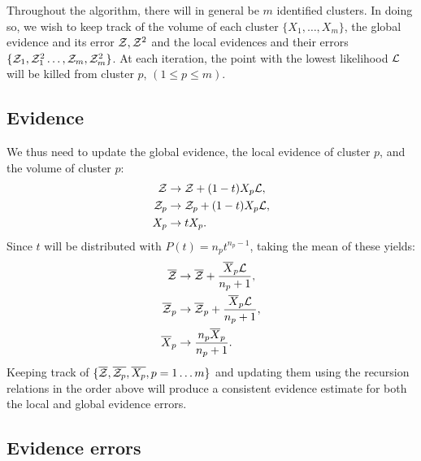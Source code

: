 Throughout the algorithm, there will in general be \(m\) identified clusters. In doing so, we wish to keep track of the volume of each cluster \(\{X_1,\ldots,X_m\}\), the global evidence and its error \(\mathcal{Z},\mathcal{Z}^2\) and the local evidences and their errors \(\{\mathcal{Z}_1,\mathcal{Z}_1^2\ldots,\mathcal{Z}_m,\mathcal{Z}_m^2\}\). At each iteration, the point with the lowest likelihood \(\mathcal{L}\) will be killed from cluster \(p\), \({(1\le p\le m)}\). 


\subsection{Evidence}
\label{sec:ens:cluster_ev}

We thus need to update the global evidence, the local evidence of cluster \(p\), and the volume of cluster \(p\):
%
\begin{align}
  \mathcal{Z} &\to \mathcal{Z} + (1-t)X_p\mathcal{L},
  \label{eqn:ens:rr_ev}\\
  \mathcal{Z}_p &\to \mathcal{Z}_p + (1-t)X_p\mathcal{L},
  \label{eqn:ens:rr_evi}\\
  X_p &\to t X_p.
  \label{eqn:ens:rr_Xi}
\end{align}
%
Since \(t\) will be distributed with \(P(t) = n_p t^{n_p-1}\),
taking the mean of these yields:
%
\begin{align}
  \overline{\mathcal{Z}} &\to \overline{\mathcal{Z}} + \frac{\overline X_p \mathcal{L}}{n_p+1},\\
  \overline{\mathcal{Z}}_p &\to \overline{\mathcal{Z}}_p + \frac{\overline X_p \mathcal{L}}{n_p+1},\\
  \overline X_p &\to \frac{n_p\overline X_p }{n_p+1}. 
\end{align}
%
Keeping track of \(\{\overline{\mathcal{Z}},\overline{\mathcal{Z}_p},\overline{X_p},p=1\ldots m\}\) and updating them using the recursion relations in the order above will produce a consistent evidence estimate for both the local and global evidence errors.


\subsection{Evidence errors}
\label{sec:ens:cluster_err}


